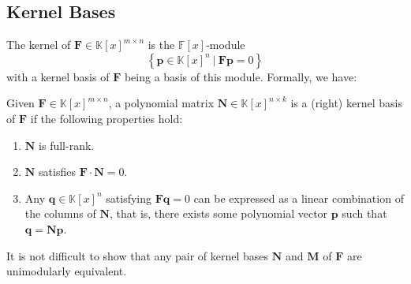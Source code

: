 \subsection{Kernel Bases}

The kernel of $\mathbf{F}\in\mathbb{K}\left[x\right]^{m\times n}$
is the $\mathbb{F}\left[x\right]$-module 
\[
\left\{ \mathbf{p}\in\mathbb{K}\left[x\right]^{n}~|~\mathbf{F}\mathbf{p}=0\right\} 
\]
 with a kernel basis of $\mathbf{F}$ being a basis of this module.
Formally, we have:
\begin{defn}
\label{def:kernelBasis}Given $\mathbf{F}\in\mathbb{K}\left[x\right]^{m\times n}$,
a polynomial matrix $\mathbf{N}\in\mathbb{K}\left[x\right]^{n\times k}$
is a (right) kernel basis of $\mathbf{F}$ if the following properties
hold: 
\begin{enumerate}
\item $\mathbf{N}$ is full-rank. 
\item $\mathbf{N}$ satisfies $\mathbf{F}\cdot\mathbf{N}=0$. 
\item Any $\mathbf{q}\in\mathbb{K}\left[x\right]^{n}$ satisfying $\mathbf{F}\mathbf{q}=0$
can be expressed as a linear combination of the columns of $\mathbf{N}$,
that is, there exists some polynomial vector $\mathbf{p}$ such that
$\mathbf{q}=\mathbf{N}\mathbf{p}$. 
\end{enumerate}
\end{defn}
It is not difficult to show that any pair of kernel bases $\mathbf{N}$
and $\mathbf{M}$ of $\mathbf{F}$ %
are unimodularly equivalent.

